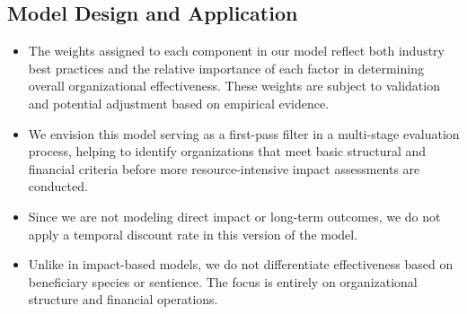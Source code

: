 \documentclass[12pt]{article}
\begin{document}
\subsection*{Model Design and Application}
\begin{itemize}
    \item The weights assigned to each component in our model reflect both industry best practices and the relative importance of each factor in determining overall organizational effectiveness. These weights are subject to validation and potential adjustment based on empirical evidence.
    
    \item We envision this model serving as a first-pass filter in a multi-stage evaluation process, helping to identify organizations that meet basic structural and financial criteria before more resource-intensive impact assessments are conducted.
    
    \item Since we are not modeling direct impact or long-term outcomes, we do not apply a temporal discount rate in this version of the model.
    
    \item Unlike in impact-based models, we do not differentiate effectiveness based on beneficiary species or sentience. The focus is entirely on organizational structure and financial operations.
\end{itemize}
\end{document}
